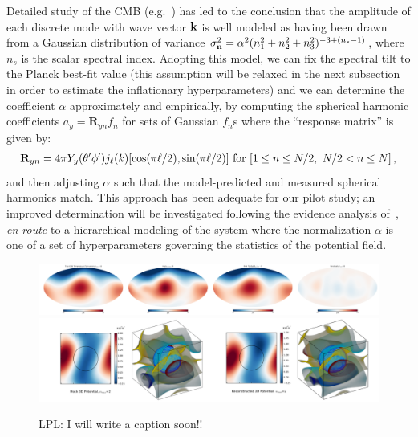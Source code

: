 \documentclass[psfig,12pt]{article}
\def\ni{\noindent}
\begin{document}
{\ni{\bf Gaussian Prior:}
Detailed study of the CMB (e.g.~\cite{Aghanim:2015xee, Ade:2015ava}) has
led to the conclusion that the amplitude of each discrete mode with wave
vector $\bf k$ is well modeled as having been drawn from a Gaussian
distribution of variance $\sigma_{\bf
n}^2=\alpha^2(n_1^2+n_2^2+n_3^2)^{-3+(n_s-1)}$, where $n_s$ is the
scalar spectral index. Adopting this model, we can fix the spectral tilt
to the Planck best-fit value (this assumption will be relaxed in the
next subsection in order to estimate the inflationary hyperparameters)
and we can determine the coefficient $\alpha$ approximately and
empirically, by computing the spherical harmonic coefficients $a_y
=\mathbf{R}_{yn}f_n$ for sets of Gaussian $f_n$s where the ``response
matrix'' is given by:
\begin{equation}
\mathbf{R}_{yn}=4\pi Y_y(\theta'\phi')j_\ell(k)[\cos(\pi\ell/2),\sin(\pi\ell/2)]\ {\rm for}\ [1\le n\le N/2,\ N/2<n\le N]\, ,
\end{equation}
and then adjusting $\alpha$ such that the model-predicted and measured
spherical harmonics match. This approach has been adequate for our pilot
study; an improved determination will be investigated following the
evidence analysis of~\cite{Suyu2006}, {\sl en route} to a hierarchical
modeling of the system where the normalization $\alpha$ is one of a set
of hyperparameters governing the statistics of the potential field.

\begin{figure}[t]
\centering\includegraphics[width=1.\linewidth]{figures/Reconstruction2D.pdf}
\\
\centering\includegraphics[width=1.\linewidth]{figures/Reconstruction3D.pdf}
\caption{{\small LPL: I will write a caption soon!! 
\label{Fig:Mockreconstruction}
}}
\end{figure}


}
\end{document}
